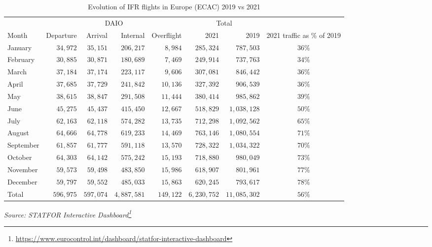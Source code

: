 \documentclass[
  11pt,
  a4paper,
]{book}
\DeclareRobustCommand{\href}[2]{#2\footnote{\url{#1}}}
\begin{document}
\hypertarget{tbl-ifr-flights-month}{}
\setlength{\LTpost}{0mm}
\begin{longtable}{lrrrrrrc}
\caption{\label{tbl-ifr-flights-month}Evolution of IFR flights in Europe (ECAC) 2019 vs 2021 }\tabularnewline

\toprule
 & \multicolumn{4}{c}{DAIO} & \multicolumn{2}{c}{Total} &  \\ 
\cmidrule(lr){2-5} \cmidrule(lr){6-7}
Month & Departure & Arrival & Internal & Overflight & 2021 & 2019 & 2021 traffic as \% of 2019 \\ 
\midrule
January & $34,972$ & $35,151$ & $206,217$ & $8,984$ & $285,324$ & $787,503$ & $36\%$ \\ 
February & $30,885$ & $30,871$ & $180,689$ & $7,469$ & $249,914$ & $737,763$ & $34\%$ \\ 
March & $37,184$ & $37,174$ & $223,117$ & $9,606$ & $307,081$ & $846,442$ & $36\%$ \\ 
April & $37,685$ & $37,729$ & $241,842$ & $10,136$ & $327,392$ & $906,539$ & $36\%$ \\ 
May & $38,615$ & $38,847$ & $291,508$ & $11,444$ & $380,414$ & $985,862$ & $39\%$ \\ 
June & $45,275$ & $45,437$ & $415,450$ & $12,667$ & $518,829$ & $1,038,128$ & $50\%$ \\ 
July & $62,163$ & $62,118$ & $574,282$ & $13,735$ & $712,298$ & $1,092,562$ & $65\%$ \\ 
August & $64,666$ & $64,778$ & $619,233$ & $14,469$ & $763,146$ & $1,080,554$ & $71\%$ \\ 
September & $61,857$ & $61,777$ & $591,118$ & $13,570$ & $728,322$ & $1,034,322$ & $70\%$ \\ 
October & $64,303$ & $64,142$ & $575,242$ & $15,193$ & $718,880$ & $980,049$ & $73\%$ \\ 
November & $59,573$ & $59,498$ & $483,850$ & $15,986$ & $618,907$ & $801,961$ & $77\%$ \\ 
December & $59,797$ & $59,552$ & $485,033$ & $15,863$ & $620,245$ & $793,617$ & $78\%$ \\ 
Total & $596,975$ & $597,074$ & $4,887,581$ & $149,122$ & $6,230,752$ & $11,085,302$ & $56\%$ \\ 
\bottomrule
\end{longtable}
\begin{minipage}{\linewidth}
\emph{Source: \href{https://www.eurocontrol.int/dashboard/statfor-interactive-dashboard}{STATFOR Interactive Dashboard}}\\
\end{minipage}
\end{document}
